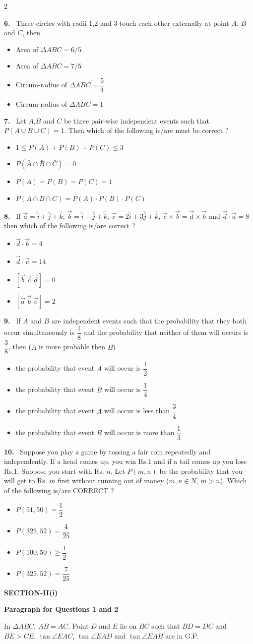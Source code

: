 \documentclass[10pt]{extarticle}
\newcommand{\sect}[1]{\par\smallskip\noindent\textbf{#1}\par}
\newcommand{\qn}[1]{\par\smallskip\noindent\textbf{#1.}~}
\newcommand{\paraq}[2]{\par\smallskip\noindent\textbf{Paragraph for Questions #1 and #2}\par}
\newenvironment{qoptions}{\begin{itemize}[leftmargin=1.8em,itemsep=1pt,topsep=2pt,label={}]}{\end{itemize}}
\newcommand{\opt}[2]{\item[(#1)] #2}
\begin{document}
\begin{multicols}{2}
\begin{qoptions}
\end{qoptions}
\qn{6} Three circles with radii 1,2 and 3 touch each other externally at point $A$, $B$ and $C$, then
\begin{qoptions}
\opt{A}{Area of $\Delta ABC=6/5$}
\opt{B}{Area of $\Delta ABC=7/5$}
\opt{C}{Circum-radius of $\Delta ABC=\dfrac54$}
\opt{D}{Circum-radius of $\Delta ABC=1$}
\end{qoptions}
\qn{7} Let $A$,$B$ and $C$ be three pair-wise independent events such that $P(A\cup B\cup C)=1$. Then which of the following is/are must be correct ?
\begin{qoptions}
\opt{A}{$1\le P(A)+P(B)+P(C)\le3$}
\opt{B}{$P(\bar A\cap\bar B\cap\bar C)=0$}
\opt{C}{$P(A)=P(B)=P(C)=1$}
\opt{D}{$P(A\cap B\cap C)=P(A)\cdot P(B)\cdot P(C)$}
\end{qoptions}
\qn{8} If $\vec a=\hat i+\hat j+\hat k$, $\vec b=\hat i-\hat j+\hat k$, $\vec c=2\hat i+3\hat j+\hat k$, $\vec c\times\vec b=\vec d\times\vec b$ and $\vec d\cdot\vec a=8$ then which of the following is/are correct ?
\begin{qoptions}
\opt{A}{$\vec d\cdot\vec b=4$}
\opt{B}{$\vec d\cdot\vec c=14$}
\opt{C}{$[\vec b\ \vec c\ \vec d]=0$}
\opt{D}{$[\vec a\ \vec b\ \vec c]=2$}
\end{qoptions}
\qn{9} If $A$ and $B$ are independent events such that the probability that they both occur simultaneously is $\dfrac18$ and the probability that neither of them will occurs is $\dfrac38$, then ($A$ is more probable then $B$)
\begin{qoptions}
\opt{A}{the probability that event $A$ will occur is $\dfrac12$}
\opt{B}{the probability that event $B$ will occur is $\dfrac14$}
\opt{C}{the probability that event $A$ will occur is less than $\dfrac34$}
\opt{D}{the probability that event $B$ will occur is more than $\dfrac13$}
\end{qoptions}
\qn{10} Suppose you play a game by tossing a fair coin repeatedly and independently. If a head comes up, you win Rs.1 and if a tail comes up you lose Rs.1. Suppose you start with Rs. $n$. Let $P(m,n)$ be the probability that you will get to Rs. $m$ first without running out of money ($m,n\in N$, $m>n$). Which of the following is/are CORRECT ?
\begin{qoptions}
\opt{A}{$P(51,50)=\dfrac12$}
\opt{B}{$P(325,52)=\dfrac4{25}$}
\opt{C}{$P(100,50)\ge\dfrac12$}
\opt{D}{$P(325,52)=\dfrac7{25}$}
\end{qoptions}
\sect{SECTION-II(i)}
\paraq{1}{2}
In $\Delta ABC$, $AB=AC$. Point $D$ and $E$ lie on $BC$ such that $BD=DC$ and $BE>CE$. $\tan\angle EAC$, $\tan\angle EAD$ and $\tan\angle EAB$ are in G.P.

\end{multicols}
\end{document}
